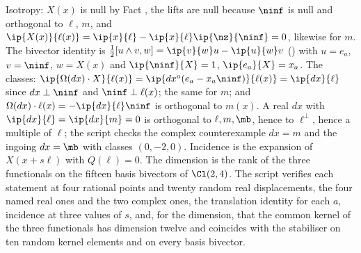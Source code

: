 Isotropy: $X(x)$ is null by Fact , the lifts are null because $\ninf$ is null and orthogonal to $\ell$, $m$, and $\ip{X(x)}{\ell(x)} = \ip{x}{\ell} - \ip{x}{\ell}\ip{\nz}{\ninf} = 0$, likewise for $m$. The bivector identity is $\tfrac12[u\wedge v, w] = \ip{v}{w}u - \ip{u}{w}v$ () with $u = e_{a}$, $v = \ninf$, $w = X(x)$ and $\ip{\ninf}{X} = 1$, $\ip{e_{a}}{X} = x_{a}$. The classes: $\ip{\Omega(dx)\cdot X}{\ell(x)} = \ip{dx^{a}(e_{a} - x_{a}\ninf)}{\ell(x)} = \ip{dx}{\ell}$ since $dx \perp \ninf$ and $\ninf \perp \ell(x)$; the same for $m$; and $\Omega(dx)\cdot\ell(x) = -\ip{dx}{\ell}\ninf$ is orthogonal to $m(x)$. A real $dx$ with $\ip{dx}{\ell} = \ip{dx}{m} = 0$ is orthogonal to $\ell, m, \mb$, hence to $\ell^{\perp}$, hence a multiple of $\ell$; the script checks the complex counterexample $dx = m$ and the ingoing $dx = \mb$ with classes $(0, -2, 0)$. Incidence is the expansion of $X(x + s\ell)$ with $Q(\ell) = 0$. The dimension is the rank of the three functionals on the fifteen basis bivectors of $\Cl(2,4)$. The script verifies each statement at four rational points and twenty random real displacements, the four named real ones and the two complex ones, the translation identity for each $a$, incidence at three values of $s$, and, for the dimension, that the common kernel of the three functionals has dimension twelve and coincides with the stabiliser on ten random kernel elements and on every basis bivector.
